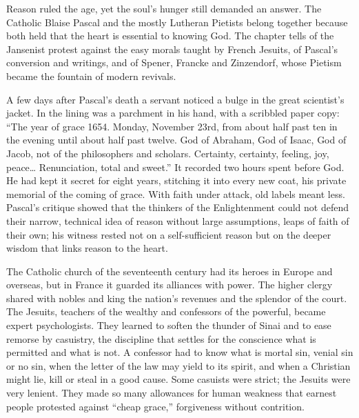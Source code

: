 
\begin{inbrief}
Reason ruled the age, yet the soul's hunger still demanded an answer. The Catholic Blaise Pascal and
the mostly Lutheran Pietists belong together because both held that the heart is essential to knowing
God. The chapter tells of the Jansenist protest against the easy morals taught by French Jesuits, of
Pascal's conversion and writings, and of Spener, Francke and Zinzendorf, whose Pietism became the
fountain of modern revivals.
\end{inbrief}

A few days after Pascal's death a servant noticed a bulge in the great scientist's jacket. In the
lining was a parchment in his hand, with a scribbled paper copy: ``The year of grace 1654. Monday,
November 23rd, from about half past ten in the evening until about half past twelve. God of Abraham,
God of Isaac, God of Jacob, not of the philosophers and scholars. Certainty, certainty, feeling, joy,
peace\dots{} Renunciation, total and sweet.'' It recorded two hours spent before God. He had kept it secret for eight years, stitching it into every new coat, his private memorial of the
coming of grace. With faith under attack, old labels meant less. Pascal's critique showed that the
thinkers of the Enlightenment could not defend their narrow, technical idea of reason without large
assumptions, leaps of faith of their own; his witness rested not on a self-sufficient reason but on
the deeper wisdom that links reason to the heart.

The Catholic church of the seventeenth century had its heroes in Europe and overseas, but in France
it guarded its alliances with power. The higher clergy shared with nobles and king the nation's
revenues and the splendor of the court. The Jesuits, teachers of the wealthy and confessors of the
powerful, became expert psychologists. They learned to soften the thunder of Sinai and to ease
remorse by casuistry, the discipline that settles for the conscience what is permitted and what is not. A confessor had to
know what is mortal sin, venial sin or no sin, when the letter of the law may yield to its spirit,
and when a Christian might lie, kill or steal in a good cause. Some casuists were strict; the
Jesuits were very lenient. They made so many allowances for human weakness that earnest people
protested against ``cheap grace,'' forgiveness without contrition.

